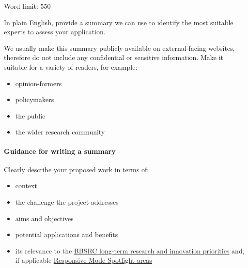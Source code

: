 
\begin{instruction}
Word limit: 550

In plain English, provide a summary we can use to identify the most suitable
experts to assess your application.

We usually make this summary publicly available on external-facing websites,
therefore do not include any confidential or sensitive information. Make it
suitable for a variety of readers, for example:

\begin{itemize}
    \item opinion-formers
    \item policymakers
    \item the public
    \item the wider research community
\end{itemize}

\paragraph{Guidance for writing a summary}

Clearly describe your proposed work in terms of:

\begin{itemize}
    \item context
    \item the challenge the project addresses
    \item aims and objectives
    \item potential applications and benefits
    \item its relevance to the
    \href{https://www.ukri.org/publications/bbsrc-strategic-delivery-plan/}{BBSRC long-term research and innovation priorities}
    and, if applicable
    \href{https://www.ukri.org/councils/bbsrc/remit-programmes-and-priorities/our-research-portfolio-and-priorities/responsive-mode-spotlights/}{Responsive Mode Spotlight areas}

\end{itemize}
\end{instruction}

